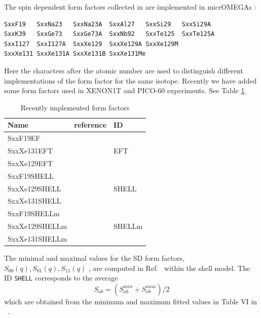\documentclass[12pt,a4paper]{article}
\begin{document}
The spin dependent   form factors collected in \cite{Bednyakov:2006ux} are implemented in micrOMEGAs
\cite{Belanger:2008sj}:
\begin{verbatim}
SxxF19   SxxNa23   SxxNa23A  SxxAl27   SxxSi29   SxxSi29A  
SxxK39   SxxGe73   SxxGe73A  SxxNb92   SxxTe125  SxxTe125A 
SxxI127  SxxI127A  SxxXe129  SxxXe129A SxxXe129M 
SxxXe131 SxxXe131A SxxXe131B SxxXe131Me 
\end{verbatim}
Here the  characters  after the atomic number are  used to distinguish different implementations of
the form factor for the same isotope. Recently we have added some form factors used in XENON1T and PICO-60 experiments. See Table
\ref{NewFF}.
\begin{table}[htbp]
\begin{center}
\begin{tabular}{|l|l|l|}
\hline
  Name      & reference            &  ID \\  
\hline
  SxxF19EF    &                      &   \\
  SxxXe131EFT & \cite{Fitzpatrick:2012ix}  &   EFT\\
  SxxXe129EFT &                      &    \\
\hline
   SxxF19SHELL&                      &  \\
   SxxXe129SHELL& \cite{Klos:2013rwa} & SHELL\\
   SxxXe131SHELL &                           & \\
\hline
   SxxF19SHELLm&                             & \\
   SxxXe129SHELLm& \cite{Klos:2013rwa} & SHELLm\\
   SxxXe131SHELLm &                           & \\
\hline
\end{tabular}
 \caption{Recently implemented form factors}
 \label{NewFF}

\end{center}
\end{table}

The  minimal and maximal values for the SD form factors, $S_{00}(q),S_{01}(q),S_{11}(q)$ , are computed in  Ref.~\cite{Klos:2013rwa} within the shell model.
The ID  {\tt SHELL} corresponds to the average 
\begin{equation}
\label{eq:middle}
   S_{ab}=(S_{ab}^{min} +S_{ab}^{max})/2
\end{equation}
which are obtained from  the minimum and maximum fitted values  in Table VI in ~\cite{Klos:2013rwa}. 
\end{document}
